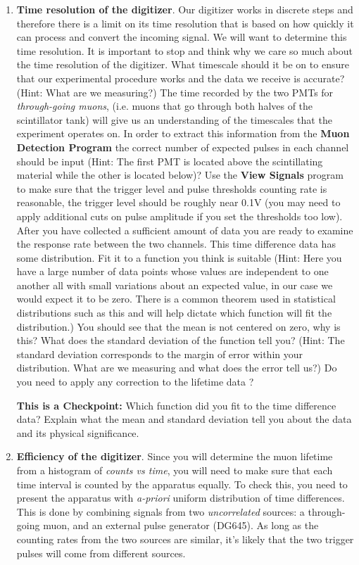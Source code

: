 \documentclass{../lab}
\begin{document}
\begin{enumerate}
    \item \textbf{Time resolution of the digitizer}. Our digitizer works in discrete steps and therefore there is a limit on its time resolution that is based on how quickly it can process and convert the incoming signal. We will want to determine this time resolution. It is important to stop and think why we care so much about the time resolution of the digitizer. What timescale should it be on to ensure that our experimental procedure works and the data we receive is accurate? (Hint: What are we measuring?) The time recorded by the two PMTs for \emph{through-going muons}, (i.e. muons that go through both halves of the scintillator tank) will give us an understanding of the timescales that the experiment operates on. In order to extract this information from the \textbf{Muon Detection Program} the correct number of expected pulses in each channel should be input (Hint: The first PMT is located above the scintillating material while the other is located below)? Use the \textbf{View Signals} program to make sure that the trigger level and pulse thresholds counting rate is reasonable, the trigger level should be roughly near 0.1V (you may need to apply additional cuts on pulse amplitude if you set the thresholds too low). After you have collected a sufficient amount of data you are ready to examine the response rate between the two channels. This time difference data has some distribution. Fit it to a function you think is suitable (Hint: Here you have a large number of data points whose values are independent to one another all with small variations about an expected value, in our case we would expect it to be zero. There is a common theorem used in statistical distributions such as this and will help dictate which function will fit the distribution.) You should see that the mean is not centered on zero, why is this? What does the standard deviation of the function tell you? (Hint: The standard deviation corresponds to the margin of error within your distribution. What are we measuring and what does the error tell us?) Do you need to apply any correction to the lifetime data ?
    
    \textbf{This is a Checkpoint: }Which function did you fit to the time difference data? Explain what the mean and standard deviation tell you about the data and its physical significance.\textbf{ }

\newpage

    \item \textbf{Efficiency of the digitizer}. Since you will determine the muon lifetime from a histogram of \emph{counts vs time}, you will need to make sure that each time interval is counted by the apparatus equally. To check this, you need to present the apparatus with \emph{a-priori} uniform distribution of time differences. This is done by combining signals from two \emph{uncorrelated} sources: a through-going muon, and an external pulse generator (DG645). As long as the counting rates from the two sources are similar, it's likely that the two trigger pulses will come from different sources.


\end{enumerate}
\end{document}
